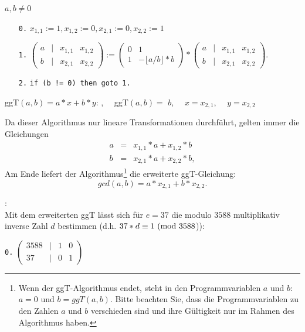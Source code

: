 \begin{refsegment}
\newpage
{} $a,b \not= 0$
\begin{itemize}
  \item[\tt 0.] $x_{1,1} := 1, x_{1,2} := 0, x_{2,1} := 0, x_{2,2} := 1$
  \item[\tt 1.] $ \left(\begin{array}{cccc} a & | & x_{1,1} & x_{1,2} \\ b & | & x_{2,1} & x_{2,2} \end{array} \right) :=
           \left(\begin{array}{cc} 0 & 1  \\ 1 & - \lfloor a/b \rfloor * b \end{array} \right)*
           \left(\begin{array}{cccc} a & | & x_{1,1} & x_{1,2} \\ b & | & x_{2,1} & x_{2,2} \end{array} \right).$
  \item[\tt 2.] {\tt if (b != 0) then goto 1.}
\end{itemize}

 \glqq ggT$(a,b) = a*x +b*y$: \grqq,~~ \glqq ggT$(a,b) =$ \grqq $b$,~~
                       \glqq $x = $\grqq $x_{2,1}$,~~ \glqq $y = $\grqq $x_{2,2}$

\noindent Da dieser Algorithmus nur lineare Transformationen durchführt, gelten immer die Gleichungen
\begin{eqnarray*}
 a & = & x_{1,1}*a + x_{1,2}*b \nonumber\\
 b & = & x_{2,1}*a + x_{2,2}*b, \nonumber
\end{eqnarray*}
Am Ende liefert der Algorithmus\footnote{%
Wenn der ggT-Algorithmus endet, steht in den Programmvariablen $a$ und $b$:
$a = 0$ und $b=ggT(a,b)$. Bitte beachten Sie, dass die Programmvariablen zu den Zahlen
$a$ und $b$ verschieden sind und ihre Gültigkeit nur im Rahmen des Algorithmus haben.
} die erweiterte ggT-Gleichung:
$$gcd(a,b) = a*x_{2,1} + b*x_{2,2}.$$

\begin{example}{:}\\
Mit dem erweiterten ggT lässt sich für $e = 37$ die modulo $3588$ multiplikativ inverse Zahl
$d$ bestimmen (d.h. $37*d \equiv 1 {\rm ~(mod~} 3588$)):

{\tt 0.}
 $ \left(\begin{array}{cccc} 3588 & | & 1 & 0 \\ 37 & | & 0 & 1 \end{array} \right)$


\end{example}
\end{refsegment}

